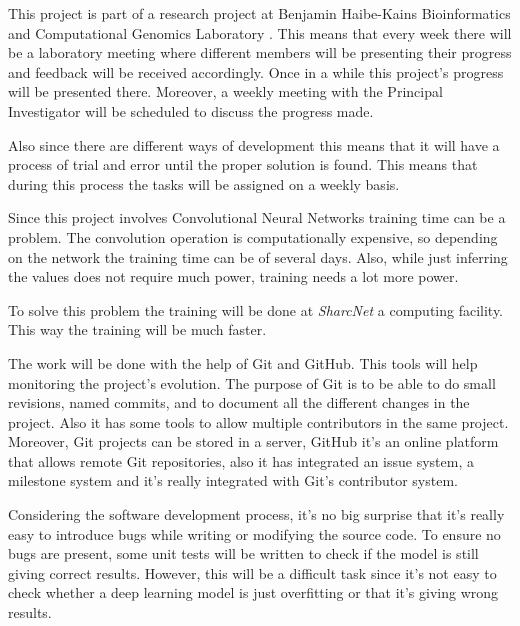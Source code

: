 
This project is part of a research project at Benjamin Haibe-Kains Bioinformatics and 
Computational Genomics Laboratory \cite{bhklab}. This means that every week there will be a 
laboratory meeting where different members will be presenting their progress and feedback will
be received accordingly. Once in a while this project's progress will be presented there.
Moreover, a weekly meeting with the Principal Investigator will be scheduled to discuss
the progress made.

Also since there are different ways of development this means that it will have a process of trial
and error until the proper solution is found. This means that during this process the
tasks will be assigned on a weekly basis.




Since this project involves Convolutional Neural Networks training time can be a problem. 
The convolution operation is computationally expensive, so depending on the network the 
training time can be of several days. Also, while just inferring the values does not require
much power, training needs a lot more power. 

To solve this problem the training will be done at \emph{SharcNet} a computing facility. 
This way the training will be much faster.


The work will be done with the help of Git and GitHub. This tools will help monitoring
the project's evolution. The purpose of Git is to be able to do small revisions,
named commits, and to document all the different changes in the project. Also it has
some tools to allow multiple contributors in the same project. Moreover,
Git projects can be stored in a server, GitHub it's an online platform that allows
remote Git repositories, also it has integrated an issue system, a milestone system
and it's really integrated with Git's contributor system.
~\cites{tool:git}{tool:github}


Considering the software development process, it's no big surprise that it's really easy to
introduce bugs while writing or modifying the source code. To ensure no bugs are present,
some unit tests will be written to check if the model is still giving correct results.
However, this will be a difficult task since it's not easy to check whether a deep 
learning model is just overfitting or that it's giving wrong results.

